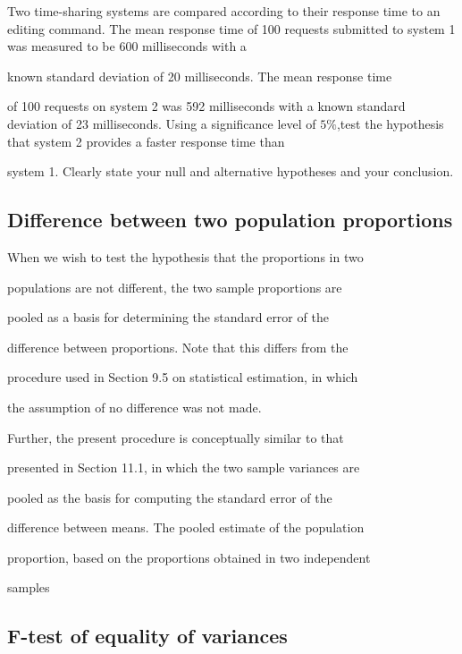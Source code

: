 Two time-sharing systems are compared according to their response time to an editing command. The mean response time of 100 requests submitted to system 1 was measured to be 600 milliseconds with a

known standard deviation of 20 milliseconds. The mean response time

of 100 requests on system 2 was 592 milliseconds with a known standard deviation of 23 milliseconds. Using a significance level of $5\%$,test the hypothesis that system 2 provides a faster response time than

system 1. Clearly state your null and alternative hypotheses and your conclusion.

 













\subsection{Difference between two population proportions}

When we wish to test the hypothesis that the proportions in two

populations are not different, the two sample proportions are

pooled as a basis for determining the standard error of the

difference between proportions. Note that this differs from the

procedure used in Section 9.5 on statistical estimation, in which

the assumption of no difference was not made.

 

Further, the present procedure is conceptually similar to that

presented in Section 11.1, in which the two sample variances are

pooled as the basis for computing the standard error of the

difference between means. The pooled estimate of the population

proportion, based on the proportions obtained in two independent

samples

 



\subsection{F-test of equality of variances}

